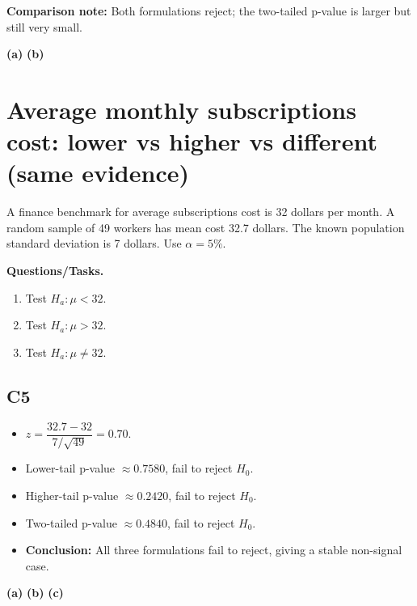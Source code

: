 \textbf{Comparison note:} Both formulations reject; the two-tailed p-value is larger but still very small.

\begin{center}
\textbf{(a)}\;
\hspace{0.8cm}
\textbf{(b)}\;
\end{center}

\section{Average monthly subscriptions cost: lower vs higher vs different (same evidence)}
A finance benchmark for average subscriptions cost is 32 dollars per month. A random sample of 49 workers has mean cost 32.7 dollars. The known population standard deviation is 7 dollars. Use \(\alpha=5\%\).

\textbf{Questions/Tasks.}
\begin{enumerate}
    \item[(a)] Test \(H_a\colon \mu<32\).
    \item[(b)] Test \(H_a\colon \mu>32\).
    \item[(c)] Test \(H_a\colon \mu\ne32\).
\end{enumerate}

\subsection*{C5}
\begin{itemize}
    \item \(z=\dfrac{32.7-32}{7/\sqrt{49}}=0.70\).
    \item Lower-tail p-value \(\approx0.7580\), fail to reject \(H_0\).
    \item Higher-tail p-value \(\approx0.2420\), fail to reject \(H_0\).
    \item Two-tailed p-value \(\approx0.4840\), fail to reject \(H_0\).
    \item \textbf{Conclusion:} All three formulations fail to reject, giving a stable non-signal case.
\end{itemize}

\begin{center}
\textbf{(a)}\;
\hspace{0.5cm}
\textbf{(b)}\;
\hspace{0.5cm}
\textbf{(c)}\;
\end{center}

